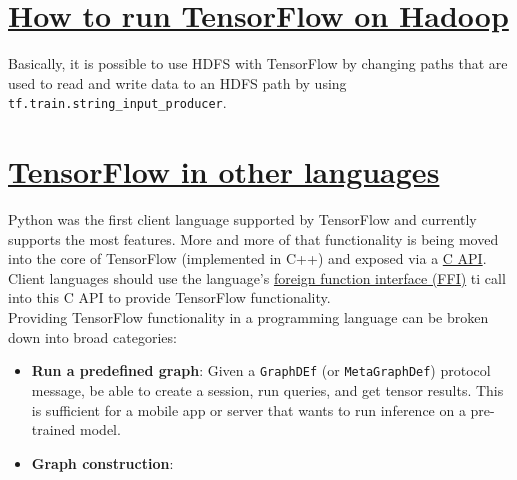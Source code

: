 \documentclass[11pt,a4paper]{article}
\begin{document}
  \section{\href{www.tensorflow.org/versions/r0.11/how_tos/hadoop/index.html}{How to run TensorFlow on Hadoop}}
  Basically, it is possible to use HDFS with TensorFlow by changing paths that are used to read and write data to an HDFS path by using \texttt{tf.train.string\_input\_producer}. 
  
  \section{\href{www.tensorflow.org/versions/r0.11/how_tos/language_bindings/index.html}{TensorFlow in other languages}}
  Python was the first client language supported by TensorFlow and currently supports the most features. More and more of that functionality is being moved into the core of TensorFlow (implemented in C++) and exposed via a \href{https://www.tensorflow.org/code/tensorflow/c/c_api.h}{C API}. Client languages should use the language's \href{https://en.wikipedia.org/wiki/Foreign_function_interface}{foreign function interface (FFI)} ti call into this C API to provide TensorFlow functionality. \\ 
  Providing TensorFlow functionality in a programming language can be broken down into broad categories: 
  \begin{itemize}
  	\item \textbf{Run a predefined graph}: Given a \texttt{GraphDEf} (or \texttt{MetaGraphDef}) protocol message, be able to create a session, run queries, and get tensor results. This is sufficient for a mobile app or server that wants to run inference on a pre-trained model. 
  	\item \textbf{Graph construction}: 
  \end{itemize}
\end{document}
